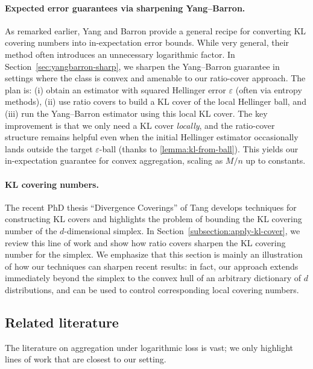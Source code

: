 \documentclass[11pt]{article}
\newcommand{\eps}{\varepsilon}
\newcommand{\M}{M}
\theoremstyle{definition}
\theoremstyle{remark}
\begin{document}
\paragraph{Expected error guarantees via sharpening Yang--Barron.}
As remarked earlier, Yang and Barron provide a general recipe for converting KL covering numbers into in-expectation error bounds. While very general, their method often introduces an unnecessary logarithmic factor. In Section~\ref{sec:yangbarron-sharp}, we sharpen the Yang--Barron guarantee in settings where the class is convex and amenable to our ratio-cover approach. The plan is: (i) obtain an estimator with squared Hellinger error $\eps$ (often via entropy methods), (ii) use ratio covers to build a KL cover of the local Hellinger ball, and (iii) run the Yang--Barron estimator using this local KL cover. The key improvement is that we only need a KL cover \emph{locally}, and the ratio-cover structure remains helpful even when the initial Hellinger estimator occasionally lands outside the target $\eps$-ball (thanks to \cref{lemma:kl-from-ball}).
This yields our in-expectation guarantee for convex aggregation, scaling as ${\M}/{n}$ up to constants.


\paragraph{KL covering numbers.}
The recent PhD thesis ``Divergence Coverings'' of Tang \cite{tang2022divergence} develops techniques for constructing KL covers and highlights the problem of bounding the KL covering number of the $d$-dimensional simplex. In Section~\ref{subsection:apply-kl-cover}, we review this line of work and show how ratio covers sharpen the KL covering number for the simplex. We emphasize that this section is mainly an illustration of how our techniques can sharpen recent results: in fact, our approach extends immediately beyond the simplex to the convex hull of an arbitrary dictionary of $d$ distributions, and can be used to control corresponding local covering numbers.


\subsection{Related literature}
The literature on aggregation under logarithmic loss is vast; we only highlight lines of work that are closest to our setting.
\end{document}

